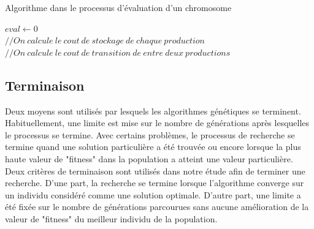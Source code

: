 \documentclass[12pt,a4paper]{article}
\begin{document}
	\begin{algorithm}[H]
 		\caption{Algorithme dans le processus d'évaluation d'un chromosome}
 		\label{alg:evaluation}
 		\BlankLine
 		$eval \gets 0$\\
 		$// On\ calcule\ le\ cout\ de\ stockage\ de\ chaque\ production$ \\
 		$// On\ calcule\ le\ cout\ de\ transition\ de\ entre\ deux\ productions$ \\
	\end{algorithm}
	
	\subsection{Terminaison}
	Deux moyens sont utilisés par lesquels les algorithmes génétiques se terminent. Habituellement, une limite est mise sur le nombre de générations après lesquelles le processus se termine. Avec certains problèmes, le processus de recherche se termine quand une solution particulière a été trouvée ou encore lorsque la plus haute valeur de "fitness" dans la population a atteint une valeur particulière. \\
	\hspace*{.5cm} Deux critères de terminaison sont utilisés dans notre étude afin de terminer une recherche. D'une part, la recherche se termine lorsque l'algorithme converge sur un individu considéré comme une solution optimale. D'autre part, une limite a été fixée sur le nombre de générations parcourues sans aucune amélioration de la valeur de "fitness" du meilleur individu de la population.
	
\end{document}
